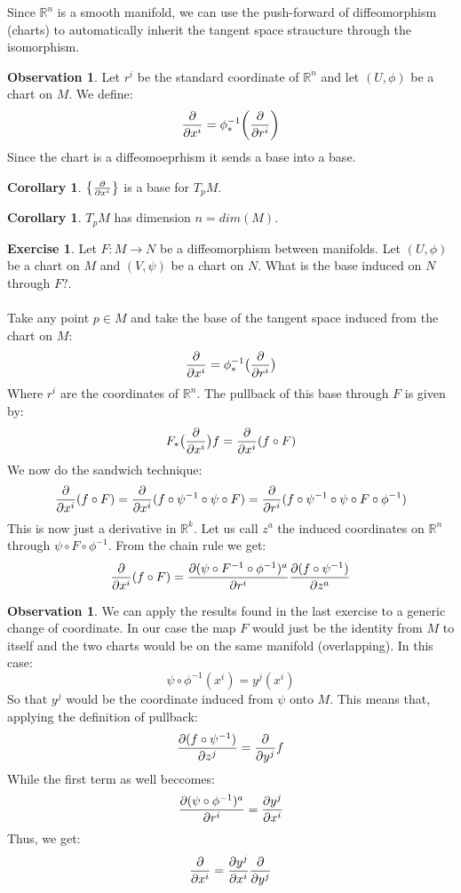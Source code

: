 \documentclass[12pt,a4paper]{report}
\theoremstyle{definition}
\theoremstyle{Theorem}
\theoremstyle{definition}
\newtheorem{Exe}[Def]{Exercise}
\theoremstyle{definition}
\newtheorem{Cor}[Def]{Corollary}
\newtheorem{Obs}[Def]{Observation}
\begin{document}
			Since $\mathbb{R}^n$ is a smooth manifold, we can use the push-forward of diffeomorphism (charts) to automatically inherit the tangent space straucture through the isomorphism.
			\begin{Obs}
				Let $r^i$ be the standard coordinate of $\mathbb{R}^n$ and let $(U,\phi)$ be a chart on $M$. We define:
				$${\partial\over \partial x^i}=\phi_*^{-1}\bigg({\partial\over \partial r^i}\bigg)$$
				Since the chart is a diffeomoeprhism it sends a base into a base.
			\end{Obs}
			\begin{Cor}
				$\big\{{\partial\over \partial x^i}\big\}$ is a base for $T_pM$.
			\end{Cor}
			\begin{Cor}
				$T_pM$ has dimension $n=dim(M)$.
			\end{Cor}
			\begin{Exe}
				Let $F:M\rightarrow N$ be a diffeomorphism between manifolds. Let $(U,\phi)$ be a chart on $M$ and $(V,\psi)$ be a chart on $N$. What is the base induced on $N$ through $F?$.\\
				\\
				Take any point $p\in M$ and take the base of the tangent space induced from the chart on $M$:
				$${\partial \over \partial x^i}=\phi_*^{-1}\big({\partial\over \partial r^i}\big)$$
				Where $r^i$ are the coordinates of $\mathbb{R}^n$. The pullback of this base through $F$ is given by:
				$$F_*\big({\partial \over \partial x^i}\big)f={\partial \over \partial x^i}(f\circ F)$$
				We now do the sandwich technique:
				$${\partial \over \partial x^i}(f\circ F)={\partial \over \partial x^i}(f\circ\psi^{-1}\circ \psi \circ F)={\partial \over \partial r^i}(f\circ\psi^{-1}\circ \psi \circ F\circ \phi^{-1})$$
				This is now just a derivative in $\mathbb{R}^k$. Let us call $z^a$ the induced coordinates on $\mathbb{R}^n$ through $\psi\circ F\circ\phi^{-1}$. From the chain rule we get:
				$${\partial \over \partial x^i}(f\circ F)={\partial (\psi\circ F^{-1}\circ \phi^{-1})^a\over \partial r^i}{\partial (f\circ \psi^{-1})\over \partial z^a}$$
			\end{Exe}
			\begin{Obs}
				We can apply the results found in the last exercise to a generic change of coordinate. In our case the map $F$ would just be the identity from $M$ to itself and the two charts would be on the same manifold (overlapping). In this case:
				$$\psi\circ\phi^{-1}(x^i)=y^j(x^i)$$
				So that $y^j$ would be the coordinate induced from $\psi$ onto $M$. This means that, applying the definition of pullback:
				$${\partial (f\circ \psi^{-1})\over \partial z^j}={\partial\over \partial y^j}f$$
				While the first term as well beccomes:
				$${\partial (\psi\circ \phi^{-1})^a\over \partial r^i}={\partial y^j\over \partial x^i}$$
				Thus, we get:
				$${\partial \over \partial x^i}={\partial y^j\over \partial x^i}{\partial\over \partial y^j}$$
			\end{Obs}
\end{document}
